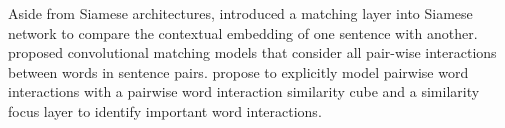 Aside from Siamese architectures, \cite{wang2017bilateral} introduced a matching layer into Siamese network to compare the contextual embedding of one sentence with another. \cite{hu2014convolutional,pang2016text} proposed convolutional matching models that consider all pair-wise interactions between words in sentence pairs.  \cite{he2016pairwise} propose to explicitly model pairwise word interactions with a pairwise word interaction similarity cube and a similarity focus layer to identify important word interactions.

